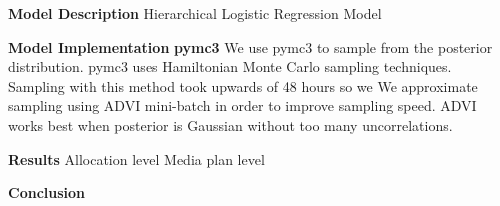 \documentclass{article}
\begin{document}
\begin{outline}[enumerate]
   \1 \textbf{Model Description}
       \2 Hierarchical Logistic Regression Model

   \1 \textbf{Model Implementation}
       \2 \textbf{pymc3}
           We use pymc3 to sample from the posterior distribution. pymc3 uses Hamiltonian Monte Carlo sampling techniques.
           Sampling with this method took upwards of 48 hours so we
           \3 We approximate sampling using ADVI mini-batch in order to improve sampling speed.
               ADVI works best when posterior is Gaussian without too many uncorrelations.

   \1 \textbf{Results}
       \2 Allocation level
       \2 Media plan level

   \1 \textbf{Conclusion}


\end{outline}
\end{document}
